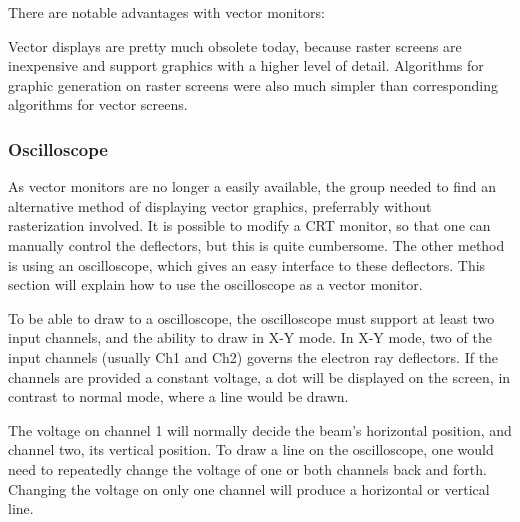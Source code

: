 There are notable advantages with vector monitors:

Vector displays are pretty much obsolete today, because raster screens are inexpensive and support graphics with a higher level of detail.
Algorithms for graphic generation on raster screens were also much simpler than corresponding algorithms for vector screens.

\subsubsection{Oscilloscope}
As vector monitors are no longer a easily available, the group needed to find an alternative method of displaying vector graphics, preferrably without rasterization involved.
It is possible to modify a CRT monitor, so that one can manually control the deflectors, but this is quite cumbersome.
The other method is using an oscilloscope, which gives an easy interface to these deflectors.
This section will explain how to use the oscilloscope as a vector monitor.


To be able to draw to a oscilloscope, the oscilloscope must support at least two input channels, and the ability to draw in X-Y mode.
In X-Y mode, two of the input channels (usually Ch1 and Ch2) governs the electron ray deflectors.
If the channels are provided a constant voltage, a dot will be displayed on the screen, in contrast to normal mode, where  a line would be drawn.

The voltage on channel 1 will normally decide the beam's horizontal position, and channel two, its vertical position.
To draw a line on the oscilloscope, one would need to repeatedly change the voltage of one or both channels back and forth.
Changing the voltage on only one channel will produce a horizontal or vertical line.

